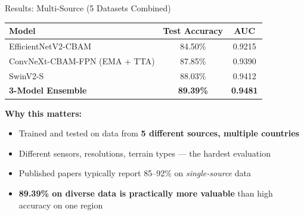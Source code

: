 \documentclass[aspectratio=169]{beamer}
\begin{document}
\begin{frame}{Results: Multi-Source (5 Datasets Combined)}
    \begin{table}
        \centering
        \begin{tabular}{lcc}
            \toprule
            \textbf{Model} & \textbf{Test Accuracy} & \textbf{AUC} \\
            \midrule
            EfficientNetV2-CBAM & 84.50\% & 0.9215 \\
            ConvNeXt-CBAM-FPN (EMA + TTA) & 87.85\% & 0.9390 \\
            SwinV2-S & 88.03\% & 0.9412 \\
            \textbf{3-Model Ensemble} & \textbf{89.39\%} & \textbf{0.9481} \\
            \bottomrule
        \end{tabular}
    \end{table}

    \vspace{0.3cm}
    \textbf{Why this matters:}
    \begin{itemize}
        \item Trained and tested on data from \textbf{5 different sources, multiple countries}
        \item Different sensors, resolutions, terrain types --- the hardest evaluation
        \item Published papers typically report 85--92\% on \textit{single-source} data
        \item \textbf{89.39\% on diverse data is practically more valuable} than high accuracy on one region
    \end{itemize}
\end{frame}
\end{document}
